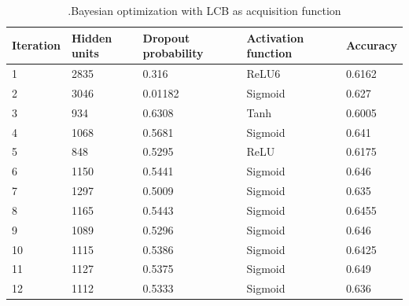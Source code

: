 \documentclass[12pt,fleqn]{article}
\begin{document}
\begin{table}[H]
	\caption{.Bayesian optimization with LCB as acquisition function \label{LCB}}
	\centering
	\begin{tabular}{|l|l|l|l|l|}
		\hline
		Iteration & Hidden units & Dropout probability & Activation function & Accuracy \\ \hline
		1 & 2835 & 0.316 & ReLU6 & 0.6162 \\ \hline 
		2 & 3046 & 0.01182 & Sigmoid & 0.627 \\ \hline 
		3 & 934 & 0.6308 & Tanh & 0.6005 \\ \hline 
		4 & 1068 & 0.5681 & Sigmoid & 0.641 \\ \hline 
		5 & 848 & 0.5295 & ReLU & 0.6175 \\ \hline 
		6 & 1150 & 0.5441 & Sigmoid & 0.646 \\ \hline 
		7 & 1297 & 0.5009 & Sigmoid & 0.635 \\ \hline 
		8 & 1165 & 0.5443 & Sigmoid & 0.6455 \\ \hline 
		9 & 1089 & 0.5296 & Sigmoid & 0.646 \\ \hline 
		10 & 1115 & 0.5386 & Sigmoid & 0.6425 \\ \hline 
		11 & 1127 & 0.5375 & Sigmoid & 0.649 \\ \hline 
		12 & 1112 & 0.5333 & Sigmoid & 0.636 \\ \hline 
	\end{tabular}
\end{table}
 
\end{document}
